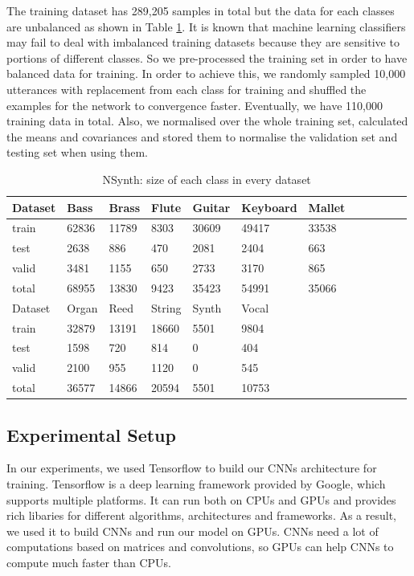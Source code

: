 \documentclass{article}
\begin{document}
The training dataset has 289,205 samples in total but the data for each classes are unbalanced as shown in Table \ref{tab:dataset}. It is known that machine learning classifiers may fail to deal with imbalanced training datasets because they are sensitive to portions of different classes. So we pre-processed the training set in order to have balanced data for training. In order to achieve this, we randomly sampled 10,000 utterances with replacement from each class for training and shuffled the examples for the network to convergence faster. Eventually, we have 110,000 training data in total. Also, we normalised over the whole training set, calculated the means and covariances and stored them to normalise the validation set and testing set when using them.

\begin{table}[t]
  \caption{NSynth: size of each class in every dataset}
  \label{tab:dataset}
  \centering
  \begin{tabular}{llllllllllll}
    \toprule
    Dataset  &Bass	& Brass	& Flute	& Guitar	& Keyboard	& Mallet\\
    \midrule
    train & 62836	& 11789	& 8303	& 30609	& 49417	& 33538\\
    test & 2638	& 886	& 470	& 2081	& 2404	& 663\\
    valid & 3481	& 1155	& 650	& 2733	& 3170	& 865\\
    total & 68955	& 13830	& 9423	& 35423	& 54991	& 35066\\
    \toprule
    Dataset  & Organ & Reed	& String    & Synth	& Vocal\\
    \midrule
    train	& 32879	& 13191	& 18660	& 5501	& 9804\\
    test   & 1598	& 720	& 814	& 0	    & 404\\
    valid    & 2100	& 955	& 1120	& 0	    & 545\\
    total   & 36577	& 14866	& 20594	& 5501	& 10753\\
    \bottomrule
  \end{tabular}
\end{table}

\subsection{Experimental Setup}

In our experiments, we used Tensorflow to build our CNNs architecture for training. Tensorflow is a deep learning framework provided by Google, which supports multiple platforms. It can run both on CPUs and GPUs and provides rich libaries for different algorithms, architectures and frameworks. As a result, we used it to build CNNs and run our model on GPUs. CNNs need a lot of computations based on matrices and convolutions, so GPUs can help CNNs to compute much faster than CPUs.
\end{document}
